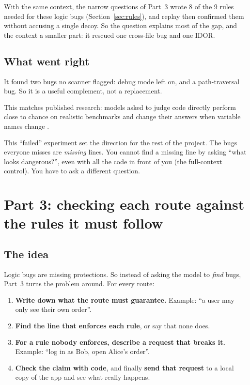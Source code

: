 \documentclass[11pt,a4paper]{article}
\begin{document}
With the same context, the narrow questions of Part~3 wrote 8 of the 9 rules needed for these logic bugs
(Section~\ref{sec:rules}), and replay then confirmed them without accusing a single decoy. So the question explains
most of the gap, and the context a smaller part: it rescued one cross-file bug and one IDOR.

\subsection{What went right}
It found two bugs no scanner flagged: debug mode left on, and a path-traversal bug. So it is a useful
complement, not a replacement.

This matches published research: models asked to judge code directly perform close to chance on
realistic benchmarks and change their answers when variable names change \cite{primevul,steenhoek,secllmholmes}.


\begin{lesson}
This ``failed'' experiment set the direction for the rest of the project. The bugs everyone misses are
\emph{missing} lines. You cannot find a missing line by asking ``what looks dangerous?'', even with all the code
in front of you (the full-context control). You have to ask a different question.
\end{lesson}

\section{Part 3: checking each route against the rules it must follow}

\subsection{The idea}
Logic bugs are missing protections. So instead of asking the model to \emph{find} bugs, Part~3 turns the
problem around. For every route:

\begin{enumerate}
  \item \textbf{Write down what the route must guarantee.} Example: ``a user may only see their own order''.
  \item \textbf{Find the line that enforces each rule}, or say that none does.
  \item \textbf{For a rule nobody enforces, describe a request that breaks it.} Example: ``log in as Bob,
        open Alice's order''.
  \item \textbf{Check the claim with code}, and finally \textbf{send that request} to a local copy of the app
        and see what really happens.
\end{enumerate}
\end{document}
